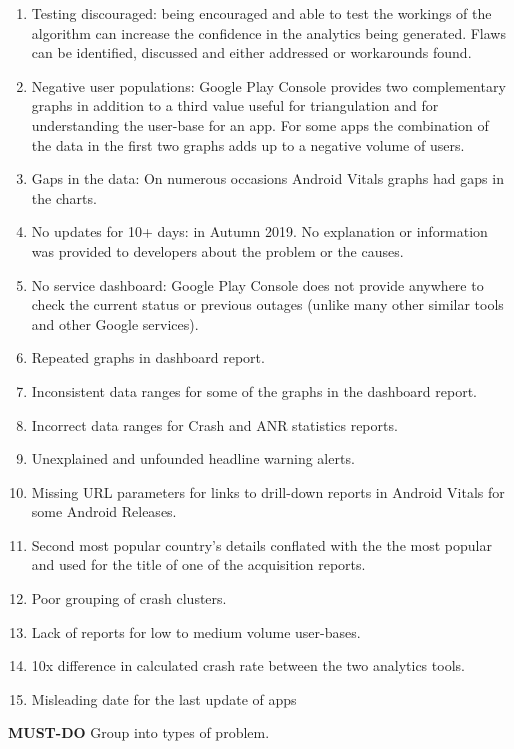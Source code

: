 \begin{enumerate}
    \item Testing discouraged: being encouraged and able to test the workings of the algorithm can increase the confidence in the analytics being generated. Flaws can be identified, discussed and either addressed or workarounds found.
    \item Negative user populations: Google Play Console provides two complementary graphs in addition to a third value useful for triangulation and for understanding the user-base for an app. For some apps the combination of the data in the first two graphs adds up to a negative volume of users.
    \item Gaps in the data: On numerous occasions Android Vitals graphs had gaps in the charts.
    \item No updates for 10+ days: in Autumn 2019. No explanation or information was provided to developers about the problem or the causes. %
    \item No service dashboard: Google Play Console does not provide anywhere to check the current status or previous outages (unlike many other similar tools and other Google services).
    \item Repeated graphs in dashboard report.
    \item Inconsistent data ranges for some of the graphs in the dashboard report.
    \item Incorrect data ranges for Crash and ANR statistics reports.
    \item Unexplained and unfounded headline warning alerts.
    \item Missing URL parameters for links to drill-down reports in Android Vitals for some Android Releases.
    \item Second most popular country's details conflated with the the most popular and used for the title of one of the acquisition reports.
    \item Poor grouping of crash clusters.
    \item Lack of reports for low to medium volume user-bases.
    \item 10x difference in calculated crash rate between the two analytics tools.
    \item Misleading date for the last update of apps
\end{enumerate}

\textbf{MUST-DO} Group into types of problem. 

